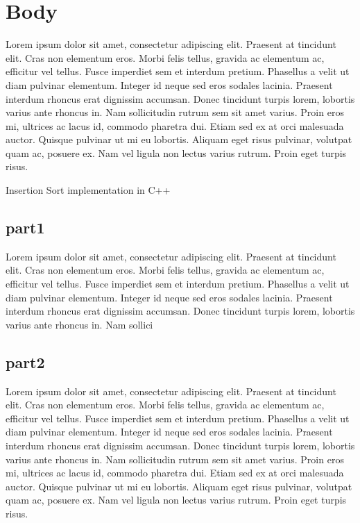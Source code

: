 \documentclass[12pt]{article}
\begin{document}
	
	\section{Body}
	
	Lorem ipsum dolor sit amet, consectetur adipiscing elit. Praesent at tincidunt elit. Cras non elementum eros. Morbi felis tellus, gravida ac elementum ac, efficitur vel tellus. Fusce imperdiet sem et interdum pretium. Phasellus a velit ut diam pulvinar elementum. Integer id neque sed eros sodales lacinia. Praesent interdum rhoncus erat dignissim accumsan. Donec tincidunt turpis lorem, lobortis varius ante rhoncus in. Nam sollicitudin rutrum sem sit amet varius. Proin eros mi, ultrices ac lacus id, commodo pharetra dui. Etiam sed ex at orci malesuada auctor. Quisque pulvinar ut mi eu lobortis. Aliquam eget risus pulvinar, volutpat quam ac, posuere ex. Nam vel ligula non lectus varius rutrum. Proin eget turpis risus.
	
	
	\begin{Snippet}
		
		\caption[Insertion Sort]{Insertion Sort implementation in C++}	
	\end{Snippet}
	
	
	
	\subsection{part1}
	
	Lorem ipsum dolor sit amet, consectetur adipiscing elit. Praesent at tincidunt elit. Cras non elementum eros. Morbi felis tellus, gravida ac elementum ac, efficitur vel tellus. Fusce imperdiet sem et interdum pretium. Phasellus a velit ut diam pulvinar elementum. Integer id neque sed eros sodales lacinia. Praesent interdum rhoncus erat dignissim accumsan. Donec tincidunt turpis lorem, lobortis varius ante rhoncus in. Nam sollici
	
	
	
	
	
	\subsection{part2}
	
	Lorem ipsum dolor sit amet, consectetur adipiscing elit. Praesent at tincidunt elit. Cras non elementum eros. Morbi felis tellus, gravida ac elementum ac, efficitur vel tellus. Fusce imperdiet sem et interdum pretium. Phasellus a velit ut diam pulvinar elementum. Integer id neque sed eros sodales lacinia. Praesent interdum rhoncus erat dignissim accumsan. Donec tincidunt turpis lorem, lobortis varius ante rhoncus in. Nam sollicitudin rutrum sem sit amet varius. Proin eros mi, ultrices ac lacus id, commodo pharetra dui. Etiam sed ex at orci malesuada auctor. Quisque pulvinar ut mi eu lobortis. Aliquam eget risus pulvinar, volutpat quam ac, posuere ex. Nam vel ligula non lectus varius rutrum. Proin eget turpis risus.
	
\end{document}
